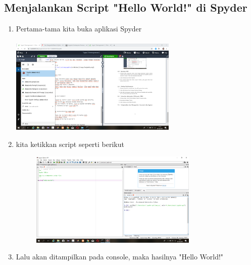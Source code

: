 \documentclass{article}
\begin{document}
\subsection{Menjalankan Script "Hello World!" di Spyder}
\begin{enumerate}
    \newpage \item Pertama-tama kita buka aplikasi Spyder
    \paragraph{}
            \centerline{\includegraphics[width=8cm]{image/spyder.png}}
    \item kita ketikkan script seperti berikut
        \begin{figure}[h]
            \centerline{\includegraphics[width=8cm]{image/helloworld.png}}
        \end{figure}
    \item Lalu akan ditampilkan pada console, maka hasilnya "Hello World!"
\end{enumerate}
\end{document}
